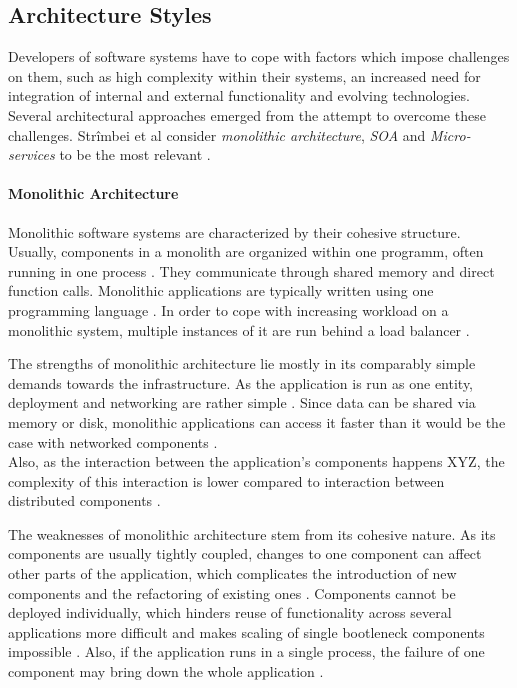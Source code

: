 
\subsection{Architecture Styles} %
  \label{sub:application_structure}
  Developers of software systems have to cope with factors which impose challenges on them, such as high complexity within their systems, an increased need for integration of internal and external functionality and evolving technologies. Several architectural approaches emerged from the attempt to overcome these challenges. Strîmbei et al consider \emph{monolithic architecture}, \emph{\ac{SOA}} and \emph{Micro-services} to be the most relevant \cite[p.~13]{Strimbei2015Software}.

  \paragraph{Monolithic Architecture} %
    \label{par:monolithic_architecture}
    Monolithic software systems are characterized by their cohesive structure. Usually, components in a monolith are organized within one programm, often running in one process \cite[p.~35]{Stubbs2015Distributed}. They communicate through shared memory and direct function calls. Monolithic applications are typically written using one programming language \cite[p.~14]{Strimbei2015Software}. In order to cope with increasing workload on a monolithic system, multiple instances of it are run behind a load balancer \cite[p.~35]{Stubbs2015Distributed}.

    The strengths of monolithic architecture lie mostly in its comparably simple demands towards the infrastructure. As the application is run as one entity, deployment and networking are rather simple \cite[p.~35]{Stubbs2015Distributed}. Since data can be shared via memory or disk, monolithic applications can access it faster than it would be the case with networked components \cite[p.~14]{Strimbei2015Software}. \\
    Also, as the interaction between the application's components happens XYZ, the complexity of this interaction is lower compared to interaction between distributed components \cite[p.~14]{Strimbei2015Software}.

    The weaknesses of monolithic architecture stem from its cohesive nature. As its components are usually tightly coupled, changes to one component can affect other parts of the application, which complicates the introduction of new components and the refactoring of existing ones \cite{Stubbs2015Distributed}.
    Components cannot be deployed individually, which hinders reuse of functionality across several applications more difficult and makes scaling of single bootleneck components impossible \cite{Stubbs2015Distributed}. Also, if the application runs in a single process, the failure of one component may bring down the whole application \cite[p.~5]{Newman2015Building}.

